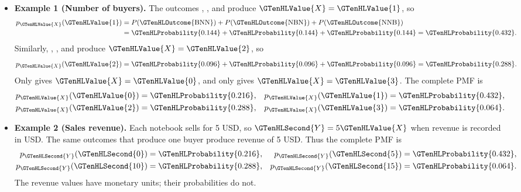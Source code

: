 \begin{itemize}
	\item \textbf{Example 1 (Number of buyers).}
	The outcomes , , and  produce $\GTenHLValue{X}=\GTenHLValue{1}$, so
	\[
	\begin{aligned}
		p_{\GTenHLValue{X}}(\GTenHLValue{1})
		&=P(\GTenHLOutcome{\mathrm{BNN}})+P(\GTenHLOutcome{\mathrm{NBN}})+P(\GTenHLOutcome{\mathrm{NNB}})\\
		&=\GTenHLProbability{0.144}+\GTenHLProbability{0.144}+\GTenHLProbability{0.144}=\GTenHLProbability{0.432}.
	\end{aligned}
	\]
	Similarly, , , and  produce $\GTenHLValue{X}=\GTenHLValue{2}$, so
	\[
	p_{\GTenHLValue{X}}(\GTenHLValue{2})=\GTenHLProbability{0.096}+\GTenHLProbability{0.096}+\GTenHLProbability{0.096}=\GTenHLProbability{0.288}.
	\]
	Only  gives $\GTenHLValue{X}=\GTenHLValue{0}$, and only  gives $\GTenHLValue{X}=\GTenHLValue{3}$.
	The complete PMF is
	\[
	\begin{aligned}
		p_{\GTenHLValue{X}}(\GTenHLValue{0})&=\GTenHLProbability{0.216}, & p_{\GTenHLValue{X}}(\GTenHLValue{1})&=\GTenHLProbability{0.432},\\
		p_{\GTenHLValue{X}}(\GTenHLValue{2})&=\GTenHLProbability{0.288}, & p_{\GTenHLValue{X}}(\GTenHLValue{3})&=\GTenHLProbability{0.064}.
	\end{aligned}
	\]
	
	\item \textbf{Example 2 (Sales revenue).}
	Each notebook sells for 5 USD, so $\GTenHLSecond{Y}=5\GTenHLValue{X}$ when revenue
	is recorded in USD. The same outcomes that produce one
	buyer produce revenue of 5 USD. Thus the complete PMF is
	\[
	\begin{aligned}
		p_{\GTenHLSecond{Y}}(\GTenHLSecond{0})&=\GTenHLProbability{0.216}, & p_{\GTenHLSecond{Y}}(\GTenHLSecond{5})&=\GTenHLProbability{0.432},\\
		p_{\GTenHLSecond{Y}}(\GTenHLSecond{10})&=\GTenHLProbability{0.288}, & p_{\GTenHLSecond{Y}}(\GTenHLSecond{15})&=\GTenHLProbability{0.064}.
	\end{aligned}
	\]
	The revenue values have monetary units; their
	probabilities do not.
	

\end{itemize}
